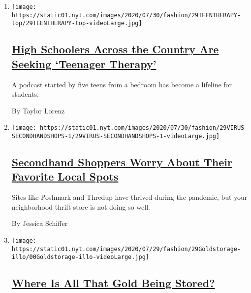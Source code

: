 \begin{enumerate}
\def\labelenumi{\arabic{enumi}.}
\item
  \texttt{[image: https://static01.nyt.com/images/2020/07/30/fashion/29TEENTHERAPY-top/29TEENTHERAPY-top-videoLarge.jpg]}

  \hypertarget{high-schoolers-across-the-country-are-seeking-teenager-therapy}{%
  \subsection{\texorpdfstring{\href{/2020/07/29/style/teenager-therapy-podcast.html}{High
  Schoolers Across the Country Are Seeking `Teenager
  Therapy'}}{High Schoolers Across the Country Are Seeking `Teenager Therapy'}}\label{high-schoolers-across-the-country-are-seeking-teenager-therapy}}

  A podcast started by five teens from a bedroom has become a lifeline
  for students.

  By Taylor Lorenz
\item
  \texttt{[image: https://static01.nyt.com/images/2020/07/30/fashion/29VIRUS-SECONDHANDSHOPS-1/29VIRUS-SECONDHANDSHOPS-1-videoLarge.jpg]}

  \hypertarget{secondhand-shoppers-worry-about-their-favorite-local-spots}{%
  \subsection{\texorpdfstring{\href{/2020/07/29/style/secondhand-clothes-coronavirus-safety.html}{Secondhand
  Shoppers Worry About Their Favorite Local
  Spots}}{Secondhand Shoppers Worry About Their Favorite Local Spots}}\label{secondhand-shoppers-worry-about-their-favorite-local-spots}}

  Sites like Poshmark and Thredup have thrived during the pandemic, but
  your neighborhood thrift store is not doing so well.

  By Jessica Schiffer
\item
  \texttt{[image: https://static01.nyt.com/images/2020/07/29/fashion/29Goldstorage-illo/00Goldstorage-illo-videoLarge.jpg]}

  \hypertarget{where-is-all-that-gold-being-stored}{%
  \subsection{\texorpdfstring{\href{/2020/07/28/style/gold-storage.html}{Where
  Is All That Gold Being
  Stored?}}{Where Is All That Gold Being Stored?}}\label{where-is-all-that-gold-being-stored}}


\end{enumerate}
